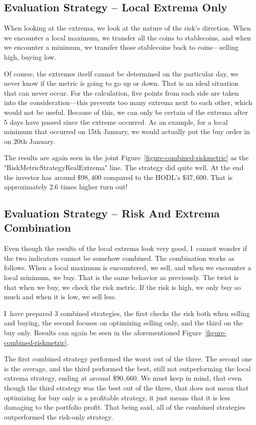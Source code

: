 \subsection*{Evaluation Strategy -- Local Extrema Only}
\label{subsection-local-extrema}
When looking at the extrema, we look at the nature of the risk's direction. When we encounter a local maximum, we transfer all the coins to stablecoins, and when we encounter a minimum, we transfer those stablecoins back to coins---selling high, buying low.

Of course, the extremes itself cannot be determined on the particular day, we never know if the metric is going to go up or down. That is an ideal situation that can never occur. For the calculation, five points from each side are taken into the consideration---this prevents too many extrema next to each other, which would not be useful. Because of this, we can only be certain of the extrema after 5 days have passed since the extreme occurred. As an example, for a local minimum that occurred on 15th January, we would actually put the buy order in on 20th January.

The results are again seen in the joint Figure~\ref{figure-combined-riskmetric} as the "RiskMetricStrategyRealExtrema" line. The strategy did quite well. At the end the investor has around $\$98,400$ compared to the HODL's $\$37,600$. That is approximately 2.6 times higher turn out!

\subsection*{Evaluation Strategy -- Risk And Extrema Combination}
Even though the results of the local extrema look very good, I~cannot wonder if the two indicators cannot be somehow combined. The combination works as follows. When a local maximum is encountered, we sell, and when we encounter a local minimum, we buy. That is the same behavior as previously. The twist is that when we buy, we check the risk metric. If the risk is high, we only buy so much and when it is low, we sell less.

I~have prepared 3 combined strategies, the first checks the risk both when selling and buying, the second focuses on optimizing selling only, and the third on the buy only. Results can again be seen in the aforementioned Figure~\ref{figure-combined-riskmetric}.

The first combined strategy performed the worst out of the three. The second one is the average, and the third performed the best, still not outperforming the local extrema strategy, ending at around $\$90,660$. We must keep in mind, that even though the third strategy was the best out of the three, that does not mean that optimizing for buy only is a profitable strategy, it just means that it is less damaging to the portfolio profit. That being said, all of the combined strategies outperformed the risk-only strategy.

